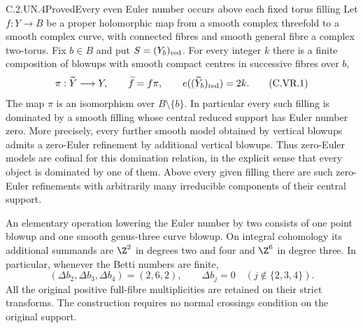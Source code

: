 \begin{statement}{C.2.UN.4}{Proved}{Every even Euler number occurs above each fixed torus filling}
Let $f:Y\to B$ be a proper holomorphic map from a smooth complex
threefold to a smooth complex curve, with connected fibres and smooth
general fibre a complex two-torus. Fix $b\in B$ and put
$S=(Y_b)_{\rm red}$. For every integer $k$ there is a finite composition
of blowups with smooth compact centres in successive fibres over $b$,
\[
 \pi:\widetilde Y\longrightarrow Y,\qquad
 \widetilde f=f\pi,\qquad
 e((\widetilde Y_b)_{\rm red})=2k.                 \tag{C.VR.1}
\]
The map $\pi$ is an isomorphism over $B\setminus\{b\}$.
In particular every such filling is dominated by a smooth filling
whose central reduced support has Euler number zero. More precisely,
every further smooth model obtained by vertical blowups admits a
zero-Euler refinement by additional vertical blowups. Thus zero-Euler
models are cofinal for this domination relation, in the explicit sense
that every object is dominated by one of them.
Above every given filling there are such zero-Euler refinements with
arbitrarily many irreducible components of their central support.

An elementary operation lowering the Euler number by two consists of
one point blowup and one smooth genus-three curve blowup. On integral
cohomology its additional summands are $\Z^2$ in degrees two and four
and $\Z^6$ in degree three. In particular, whenever the Betti numbers
are finite,
\[
 (\Delta b_2,\Delta b_3,\Delta b_4)=(2,6,2),
 \qquad \Delta b_j=0\quad(j\notin\{2,3,4\}).       \tag{C.VR.2}
\]
All the original positive full-fibre multiplicities are retained on
their strict transforms. The construction requires no normal crossings
condition on the original support.
\end{statement}
